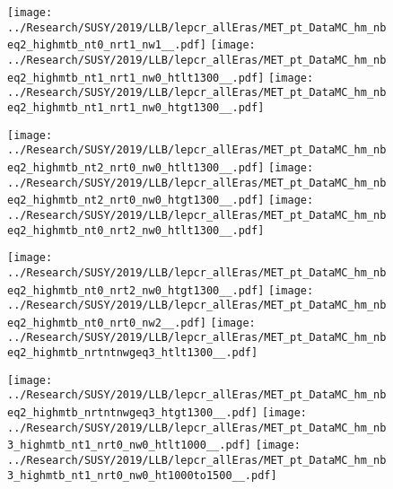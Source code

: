 \begin{figure}[!htb]
  \texttt{[image: ../Research/SUSY/2019/LLB/lepcr\_allEras/MET\_pt\_DataMC\_hm\_nbeq2\_highmtb\_nt0\_nrt1\_nw1\_\_.pdf]}
\endminipage\hfill
{}
  \texttt{[image: ../Research/SUSY/2019/LLB/lepcr\_allEras/MET\_pt\_DataMC\_hm\_nbeq2\_highmtb\_nt1\_nrt1\_nw0\_htlt1300\_\_.pdf]}
\endminipage\hfill
{}
  \texttt{[image: ../Research/SUSY/2019/LLB/lepcr\_allEras/MET\_pt\_DataMC\_hm\_nbeq2\_highmtb\_nt1\_nrt1\_nw0\_htgt1300\_\_.pdf]}
\endminipage
\end{figure}

\begin{figure}[!htb]
  \texttt{[image: ../Research/SUSY/2019/LLB/lepcr\_allEras/MET\_pt\_DataMC\_hm\_nbeq2\_highmtb\_nt2\_nrt0\_nw0\_htlt1300\_\_.pdf]}
\endminipage\hfill
{}
  \texttt{[image: ../Research/SUSY/2019/LLB/lepcr\_allEras/MET\_pt\_DataMC\_hm\_nbeq2\_highmtb\_nt2\_nrt0\_nw0\_htgt1300\_\_.pdf]}
\endminipage\hfill
{}
  \texttt{[image: ../Research/SUSY/2019/LLB/lepcr\_allEras/MET\_pt\_DataMC\_hm\_nbeq2\_highmtb\_nt0\_nrt2\_nw0\_htlt1300\_\_.pdf]}
\endminipage
\end{figure}

\begin{figure}[!htb]
  \texttt{[image: ../Research/SUSY/2019/LLB/lepcr\_allEras/MET\_pt\_DataMC\_hm\_nbeq2\_highmtb\_nt0\_nrt2\_nw0\_htgt1300\_\_.pdf]}
\endminipage\hfill
{}
  \texttt{[image: ../Research/SUSY/2019/LLB/lepcr\_allEras/MET\_pt\_DataMC\_hm\_nbeq2\_highmtb\_nt0\_nrt0\_nw2\_\_.pdf]}
\endminipage\hfill
{}
  \texttt{[image: ../Research/SUSY/2019/LLB/lepcr\_allEras/MET\_pt\_DataMC\_hm\_nbeq2\_highmtb\_nrtntnwgeq3\_htlt1300\_\_.pdf]}
\endminipage
\end{figure}

\begin{figure}[!htb]
  \texttt{[image: ../Research/SUSY/2019/LLB/lepcr\_allEras/MET\_pt\_DataMC\_hm\_nbeq2\_highmtb\_nrtntnwgeq3\_htgt1300\_\_.pdf]}
\endminipage\hfill
{}
  \texttt{[image: ../Research/SUSY/2019/LLB/lepcr\_allEras/MET\_pt\_DataMC\_hm\_nb3\_highmtb\_nt1\_nrt0\_nw0\_htlt1000\_\_.pdf]}
\endminipage\hfill
{}
  \texttt{[image: ../Research/SUSY/2019/LLB/lepcr\_allEras/MET\_pt\_DataMC\_hm\_nb3\_highmtb\_nt1\_nrt0\_nw0\_ht1000to1500\_\_.pdf]}
\endminipage
\end{figure}

